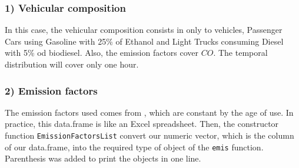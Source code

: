 \documentclass[12pt,graybox,envcountchap,sectrefs]{krantz}
\makeatletter
\newenvironment{Shaded}{\begin{snugshade}}{\end{snugshade}}
\newcommand{\KeywordTok}[1]{\textcolor[rgb]{0.13,0.29,0.53}{\textbf{#1}}}
\newcommand{\DecValTok}[1]{\textcolor[rgb]{0.00,0.00,0.81}{#1}}
\newcommand{\StringTok}[1]{\textcolor[rgb]{0.31,0.60,0.02}{#1}}
\newcommand{\CommentTok}[1]{\textcolor[rgb]{0.56,0.35,0.01}{\textit{#1}}}
\newcommand{\OperatorTok}[1]{\textcolor[rgb]{0.81,0.36,0.00}{\textbf{#1}}}
\newcommand{\NormalTok}[1]{#1}
\newenvironment{kframe}{%
\medskip{}
\setlength{\fboxsep}{.8em}
 \def\at@end@of@kframe{}%
 \ifinner\ifhmode%
  \def\at@end@of@kframe{\end{minipage}}%
  \begin{minipage}{\columnwidth}%
 \fi\fi%
 \def\FrameCommand##1{\hskip\@totalleftmargin \hskip-\fboxsep
 \colorbox{shadecolor}{##1}\hskip-\fboxsep
     \hskip-\linewidth \hskip-\@totalleftmargin \hskip\columnwidth}%
 \MakeFramed {\advance\hsize-\width
   \@totalleftmargin\z@ \linewidth\hsize
   \@setminipage}}%
 {\par\unskip\endMakeFramed%
 \at@end@of@kframe}
\renewenvironment{Shaded}{\begin{kframe}}{\end{kframe}}
\theoremstyle{definition}
\theoremstyle{definition}
\theoremstyle{definition}
\theoremstyle{remark}
\makeatother
\begin{document}
\begin{Shaded}
\end{Shaded}

\subsubsection{1) Vehicular composition}\label{vehicular-composition-1}

In this case, the vehicular composition consists in only to vehicles,
Passenger Cars using Gasoline with 25\% of Ethanol and Light Trucks
consuming Diesel with 5\% od biodiesel. Also, the emission factors cover
\(CO\). The temporal distribution will cover only one hour.

\begin{Shaded}
\end{Shaded}

\subsubsection{2) Emission factors}\label{emission-factors}

The emission factors used comes from \citet{CETESB2015}, which are
constant by the age of use. In practice, this data.frame is like an
Excel spreadsheet. Then, the constructor function
\texttt{EmissionFactorsList} convert our numeric vector, which is the
column of our data.frame, into the required type of object of the
\texttt{emis} function. Parenthesis was added to print the objects in
one line.

\begin{Shaded}
\end{Shaded}
\end{document}
